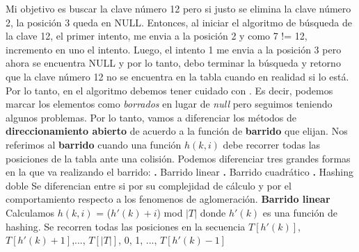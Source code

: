 \documentclass[10pt,a4paper]{article}
\begin{document}
Mi objetivo es buscar la clave número 12 pero si justo se elimina la clave número 2, la posición 3 queda en NULL. Entonces, al iniciar el algoritmo de búsqueda de la clave 12, el primer intento, me envia a la posición 2 y como 7 != 12, incremento en uno el intento. Luego, el intento 1 me envia a la posición 3 pero ahora se encuentra NULL y por lo tanto, debo terminar la búsqueda y retorno que la clave número 12 no se encuentra en la tabla cuando en realidad si lo está. 
\newline
\newline
Por lo tanto, en el algoritmo debemos tener cuidado con . Es decir, podemos marcar los elementos como \textit{borrados} en lugar de \textit{null} pero seguimos teniendo algunos problemas.
\newline
\newline
Por lo tanto, vamos a diferenciar los métodos de \textbf{direccionamiento abierto} de acuerdo a la función de \textbf{barrido} que elijan.
\newline
\newline
Nos referimos al \textbf{barrido} cuando una función $h(k,i)$ debe recorrer todas las posiciones de la tabla ante una colisión.
\newline
\newline
Podemos diferenciar tres grandes formas en la que va realizando el barrido:
\newline
\newline
\textbf{.} Barrido linear
\newline
\newline
\textbf{.} Barrido cuadrático
\newline
\newline
\textbf{.} Hashing doble
\newline
\newline
Se diferencian entre si por su complejidad de cálculo y por el comportamiento respecto a los fenomenos de aglomeración.
\newline
\newline
\textbf{Barrido linear}
\newline
\newline
Calculamos $h(k,i)$ = ($h'(k) + i$) mod $|T|$ donde $h'(k)$ es una función de hashing.
\newline
\newline
Se recorren todas las posiciones en la secuencia $T[h'(k)]$, $T[h'(k)+1]$,..., $T[|T|]$, 0, 1, ..., $T[h'(k)-1]$
\newline
\newline
\end{document}
